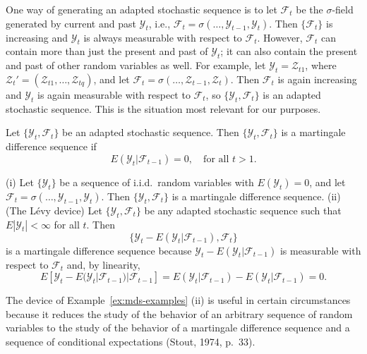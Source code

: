 One way of generating an adapted stochastic sequence is to let $\mathcal{F}_t$ be the $\sigma$-field generated by current and past $\mathcal{Y}_t$, i.e., $\mathcal{F}_t = \sigma(\ldots, \mathcal{Y}_{t-1}, \mathcal{Y}_t)$. Then $\{\mathcal{F}_t\}$ is increasing and $\mathcal{Y}_t$ is always measurable with respect to $\mathcal{F}_t$. However, $\mathcal{F}_t$ can contain more than just the present and past of $\mathcal{Y}_t$; it can also contain the present and past of other random variables as well. For example, let $\mathcal{Y}_t = \mathcal{Z}_{t1}$, where $\boldsymbol{\mathcal{Z}}_t' = (\mathcal{Z}_{t1}, \ldots, \mathcal{Z}_{tq})$, and let $\mathcal{F}_t = \sigma(\ldots, \boldsymbol{\mathcal{Z}}_{t-1}, \boldsymbol{\mathcal{Z}}_t)$. Then $\mathcal{F}_t$ is again increasing and $\mathcal{Y}_t$ is again measurable with respect to $\mathcal{F}_t$, so $\{\mathcal{Y}_t, \mathcal{F}_t\}$ is an adapted stochastic sequence. This is the situation most relevant for our purposes.

\begin{definition}\label{def:mds}
Let $\{\mathcal{Y}_t, \mathcal{F}_t\}$ be an adapted stochastic sequence. Then $\{\mathcal{Y}_t, \mathcal{F}_t\}$ is a martingale difference sequence if
\[
E(\mathcal{Y}_t | \mathcal{F}_{t-1}) = 0, \quad \text{for all } t > 1.
\]
\end{definition}

\begin{example}\label{ex:mds-examples}
(i) Let $\{\mathcal{Y}_t\}$ be a sequence of i.i.d.\ random variables with $E(\mathcal{Y}_t) = 0$, and let $\mathcal{F}_t = \sigma(\ldots, \mathcal{Y}_{t-1}, \mathcal{Y}_t)$. Then $\{\mathcal{Y}_t, \mathcal{F}_t\}$ is a martingale difference sequence. (ii) (The L\'{e}vy device) Let $\{\mathcal{Y}_t, \mathcal{F}_t\}$ be any adapted stochastic sequence such that $E|\mathcal{Y}_t| < \infty$ for all $t$. Then
\[
\{\mathcal{Y}_t - E(\mathcal{Y}_t | \mathcal{F}_{t-1}), \mathcal{F}_t\}
\]
is a martingale difference sequence because $\mathcal{Y}_t - E(\mathcal{Y}_t | \mathcal{F}_{t-1})$ is measurable with respect to $\mathcal{F}_t$ and, by linearity,
\[
E[\mathcal{Y}_t - E(\mathcal{Y}_t | \mathcal{F}_{t-1}) | \mathcal{F}_{t-1}] = E(\mathcal{Y}_t | \mathcal{F}_{t-1}) - E(\mathcal{Y}_t | \mathcal{F}_{t-1}) = 0.
\]
\end{example}

The device of Example~\ref{ex:mds-examples} (ii) is useful in certain circumstances because it reduces the study of the behavior of an arbitrary sequence of random variables to the study of the behavior of a martingale difference sequence and a sequence of conditional expectations (Stout, 1974, p.~33).

